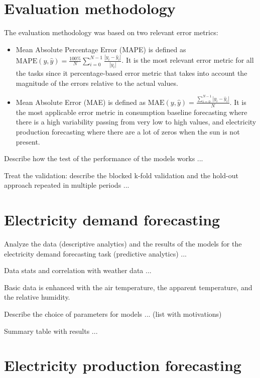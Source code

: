 \section{Evaluation methodology}
\label{sec:methodology}
\vspace{0.2 cm}

The evaluation methodology was based on two relevant error metrics:
\begin{itemize}
  \item Mean Absolute Percentage Error (MAPE) is defined as $\text{MAPE}(y, \hat{y}) = \frac{100\%}{N} \sum_{i=0}^{N - 1} \frac{|y_i - \hat{y}_i|}{|y_i|}$. It is the most relevant error metric for all the tasks since it percentage-based error metric that takes into account the magnitude of the errors relative to the actual values.
  \item Mean Absolute Error (MAE) is defined as $\text{MAE}(y, \hat{y}) = \frac{ \sum_{i=0}^{N - 1} |y_i - \hat{y}_i| }{N}$. It is the most applicable error metric in consumption baseline forecasting where there is a high variability passing from very low to high values, and electricity production forecasting where there are a lot of zeros when the sun is not present.
\end{itemize}

Describe how the test of the performance of the models works ...

Treat the validation: describe the blocked k-fold validation and the hold-out approach repeated in multiple periods ...


\section{Electricity demand forecasting}
\label{sec:demandval}
\vspace{0.2 cm}

Analyze the data (descriptive analytics) and the results of the models for the electricity demand forecasting task (predictive analytics) ...

Data stats and correlation with weather data ...

Basic data is enhanced with the air temperature, the apparent temperature, and the relative humidity.

Describe the choice of parameters for models ... (list with motivations)

Summary table with results ...


\section{Electricity production forecasting}
\label{sec:productionval}
\vspace{0.2 cm}

